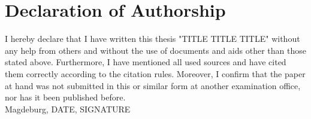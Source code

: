 \section{Declaration of Authorship}
I hereby declare that I have written this thesis "TITLE TITLE TITLE"
without any help from others and without the use of documents and aids
other than those stated above. Furthermore, I have mentioned all used
sources and have cited them correctly according to the citation rules.
Moreover, I confirm that the paper at hand was not submitted in this or
similar form at another examination office, nor has it been published
before.
\\
Magdeburg, DATE, SIGNATURE